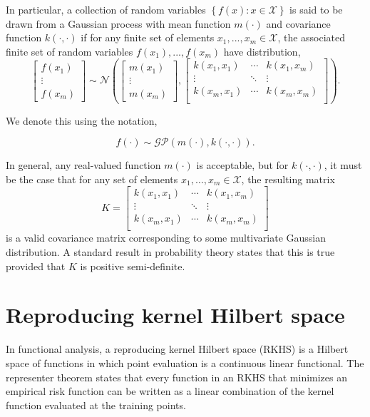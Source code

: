 \documentclass{article}
\begin{document}
In particular, a collection of random variables $\left \{ f(x): x \in \mathcal{X} \right \}$ is said to be drawn from a Gaussian process with mean function $m(\cdot)$ and covariance function $k(\cdot , \cdot)$ if for any finite set of elements $x_1,...,x_m \in \mathcal{X}$, the associated finite set of random variables $f(x_1),...,f(x_m)$ have distribution,
$$\begin{bmatrix}
f(x_1)\\
\vdots \\
f(x_m) 
\end{bmatrix} \sim \mathcal{N} \left( 
\begin{bmatrix}
m(x_1)\\
\vdots \\
m(x_m) 
\end{bmatrix}, \begin{bmatrix}
k(x_1, x_1) & \cdots & k(x_1, x_m) \\
\vdots & \ddots & \vdots\\
k(x_m, x_1) & \cdots & k(x_m, x_m) \\
\end{bmatrix} 
\right).$$

We denote this using the notation,

$$f(\cdot) \sim \mathcal{GP}(m(\cdot), k(\cdot, \cdot)).$$

In general, any real-valued function $m(\cdot)$ is acceptable, but for $k(\cdot, \cdot)$, it must be the case that for any set of elements $x_1, \dotsc, x_m \in \mathcal{X}$, the resulting matrix
$$K = \begin{bmatrix}
k(x_1, x_1) & \cdots & k(x_1, x_m) \\
\vdots & \ddots & \vdots\\
k(x_m, x_1) & \cdots & k(x_m, x_m) \\
\end{bmatrix} $$
is a valid covariance matrix corresponding to some multivariate
Gaussian distribution. A standard result in probability theory states
that this is true provided that $K$ is positive semi-definite.

\section{Reproducing kernel Hilbert space}
In functional analysis, a reproducing kernel Hilbert space (RKHS) is a
Hilbert space of functions in which point evaluation is a continuous
linear functional. The representer theorem states that every function
in an RKHS that minimizes an empirical risk function can be written as
a linear combination of the kernel function evaluated at the training
points.



\end{document}
